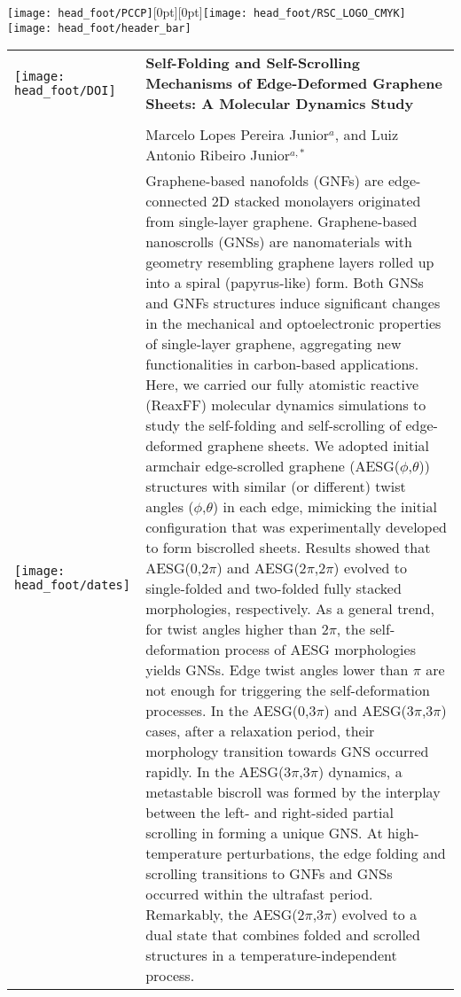 \documentclass[twoside,twocolumn,9pt]{article}
\begin{document}
  \begin{@twocolumnfalse}
{\texttt{[image: head\_foot/PCCP]}\hfill\raisebox{0pt}[0pt][0pt]{\texttt{[image: head\_foot/RSC\_LOGO\_CMYK]}}\\[1ex]
\texttt{[image: head\_foot/header\_bar]}}\par
\vspace{1em}
\sffamily
\begin{tabular}{m{4.5cm} p{13.5cm} }

\texttt{[image: head\_foot/DOI]} & \noindent\LARGE{\textbf{Self-Folding and Self-Scrolling Mechanisms of Edge-Deformed Graphene Sheets: A Molecular Dynamics Study}} \\%
\vspace{0.3cm} & \vspace{0.3cm} \\

 & \noindent\large{Marcelo Lopes Pereira Junior$^{a}$, and Luiz Antonio Ribeiro Junior$^{a,*}$} \\%

\texttt{[image: head\_foot/dates]} & \noindent\normalsize{Graphene-based nanofolds (GNFs) are edge-connected 2D stacked monolayers originated from single-layer graphene. Graphene-based nanoscrolls (GNSs) are nanomaterials with geometry resembling graphene layers rolled up into a spiral (papyrus-like) form. Both GNSs and GNFs structures induce significant changes in the mechanical and optoelectronic properties of single-layer graphene, aggregating new functionalities in carbon-based applications. Here, we carried our fully atomistic reactive (ReaxFF) molecular dynamics simulations to study the self-folding and self-scrolling of edge-deformed graphene sheets. We adopted initial armchair edge-scrolled graphene (AESG($\phi$,$\theta$)) structures with similar (or different) twist angles ($\phi$,$\theta$) in each edge, mimicking the initial configuration that was experimentally developed to form biscrolled sheets. Results showed that AESG(0,$2\pi$) and AESG(2$\pi$,$2\pi$) evolved to single-folded and two-folded fully stacked morphologies, respectively. As a general trend, for twist angles higher than $2\pi$, the self-deformation process of AESG morphologies yields GNSs. Edge twist angles lower than $\pi$ are not enough for triggering the self-deformation processes. In the AESG(0,3$\pi$) and AESG(3$\pi$,3$\pi$) cases, after a relaxation period, their morphology transition towards GNS occurred rapidly. In the AESG(3$\pi$,3$\pi$) dynamics, a metastable biscroll was formed by the interplay between the left- and right-sided partial scrolling in forming a unique GNS. At high-temperature perturbations, the edge folding and scrolling transitions to GNFs and GNSs occurred within the ultrafast period. Remarkably, the AESG(2$\pi$,3$\pi$) evolved to a dual state that combines folded and scrolled structures in a temperature-independent process.} \\%


\end{tabular}
\end{@twocolumnfalse}
\end{document}
